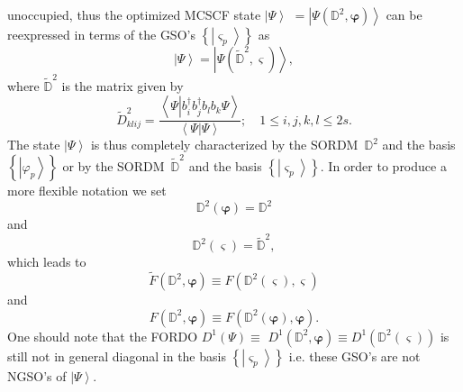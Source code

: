 \documentclass[aps,preprint]{revtex4}%
\begin{document}
unoccupied, thus the optimized MCSCF state $\left\vert \Psi\right\rangle $
$=\left\vert \Psi\left(  \mathbb{D}^{2},\bm{\varphi}\right)  \right\rangle $
can be reexpressed in terms of the GSO's $\left\{  \left\vert \varsigma
_{p}\right\rangle \right\}  $ as
\begin{equation}
\left\vert \Psi\right\rangle =\left\vert \Psi\left(  \mathbb{\tilde{D}}%
^{2},\bm{\varsigma}\right)  \right\rangle ,
\end{equation}
where $\mathbb{\tilde{D}}^{2}$ is the matrix given by
\begin{equation}
\tilde{D}_{klij}^{2}=\frac{\left\langle \Psi\left\vert b_{i}^{\dagger}%
b_{j}^{\dagger}b_{l}b_{k}\Psi\right.  \right\rangle }{\left\langle \left.
\Psi\right\vert \Psi\right\rangle };\quad1\leq i,j,k,l\leq2s.
\end{equation}
The state $\left\vert \Psi\right\rangle $ is thus completely characterized by
the SORDM\ $\mathbb{D}^{2}$ and the basis $\left\{  \left\vert \varphi
_{p}\right\rangle \right\}  $ or by the SORDM\ $\mathbb{\tilde{D}}^{2}$ and
the basis $\left\{  \left\vert \varsigma_{p}\right\rangle \right\}  $. In
order to produce a more flexible notation we set
\begin{equation}
\mathbb{D}^{2}\left(  \bm{\varphi}\right)  =\mathbb{D}^{2}%
\end{equation}
and
\begin{equation}
\mathbb{D}^{2}\left(  \bm{\varsigma}\right)  =\mathbb{\tilde{D}}^{2},
\end{equation}
which leads to
\begin{equation}
\tilde{F}\left(  \mathbb{D}^{2},\bm{\varphi}\right)  \equiv F\left(
\mathbb{D}^{2}\left(  \bm{\varsigma}\right)  ,\bm{\varsigma}\right)
\end{equation}
and
\begin{equation}
F\left(  \mathbb{D}^{2},\bm{\varphi}\right)  \equiv F\left(  \mathbb{D}%
^{2}\left(  \bm{\varphi}\right)  ,\bm{\varphi}\right)  .
\end{equation}
One should note that the FORDO $D^{1}\left(  \Psi\right)  \equiv$
$D^{1}\left(  \mathbb{D}^{2},\bm{\varphi}\right)  \equiv D^{1}\left(
\mathbb{D}^{2}\left(  \bm{\varsigma}\right)  \right)  $ is still not in
general diagonal in the basis $\left\{  \left\vert \varsigma_{p}\right\rangle
\right\}  $ i.e. these GSO's are not NGSO's of $\left\vert \Psi\right\rangle $.
\end{document}

